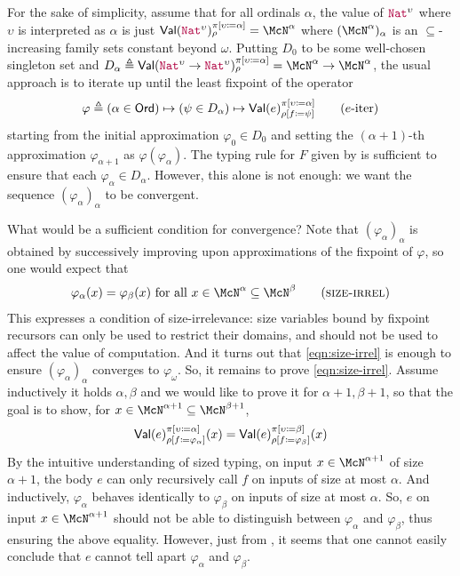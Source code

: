 For the sake of simplicity, assume that for all ordinals $\alpha$, the
value of $\Nat^\upsilon$ where $\upsilon$ is interpreted as $\alpha$
is just
$\Val(\Nat^\upsilon)_\rho^{\subst{\pi}{\upsilon}{\alpha}} =
\McN^\alpha$ where $(\McN^\alpha)_\alpha$ is an $\subseteq$-increasing
family sets constant beyond $\omega$.
%
Putting $D_0$ to be some well-chosen singleton set and
$D_\alpha \triangleq \Val(\Nat^\upsilon \to
\Nat^\upsilon)_\rho^{\subst{\pi}{\upsilon}{\alpha}} = \McN^\alpha \to
\McN^\alpha$, the usual approach is to iterate up until the least
fixpoint of the operator
%
\begin{align*}
  \varphi \triangleq
  (\alpha \in \Ord) \mapsto (\psi \in D_\alpha) \mapsto \Val(e)_{\subst{\rho}{f}{\psi}}^{\subst{\pi}{\upsilon}{\alpha}}
  \tag{$e$-iter}\label{eqn:e-iter}
\end{align*}
%
starting from the initial approximation $\varphi_0 \in D_0$ and
setting the $(\alpha+1)$-th approximation $\varphi_{\alpha+1}$ as
$\varphi(\varphi_\alpha)$.
%
The typing rule for $F$ given by  is sufficient
to ensure that each $\varphi_\alpha \in D_\alpha$.
%
However, this alone is not enough: we want the sequence
$(\varphi_\alpha)_\alpha$ to be convergent.

What would be a sufficient condition for convergence?
%
Note that $(\varphi_\alpha)_\alpha$ is obtained by successively
improving upon approximations of the fixpoint of $\varphi$, so one
would expect that
%
\begin{align*}
  \varphi_\alpha(x) = \varphi_\beta(x) \text{ for all } x \in \McN^\alpha \subseteq \McN^\beta
  \label{eqn:size-irrel}\tag{\textsc{size-irrel}}
\end{align*}
%
This expresses a condition of size-irrelevance: size variables bound
by fixpoint recursors can only be used to restrict their domains, and
should not be used to affect the value of computation.
%
And it turns out that \eqref{eqn:size-irrel} is enough to ensure
$(\varphi_\alpha)_\alpha$ converges to $\varphi_\omega$.
%
So, it remains to prove \eqref{eqn:size-irrel}.
%
Assume inductively it holds $\alpha,\beta$ and we would like to prove
it for $\alpha+1,\beta+1$, so that the goal is to show, for
$x \in \McN^{\alpha+1} \subseteq \McN^{\beta+1}$,
%
\begin{align*}
  \textsf{Val}(e)_{\rho [f \coloneqq \varphi_\alpha]}^{\pi [\upsilon \coloneqq \alpha]}(x) =
  \textsf{Val}(e)_{\rho [f \coloneqq \varphi_\beta]}^{\pi [\upsilon \coloneqq \beta]}(x)
\end{align*}
%
By the intuitive understanding of sized typing, on input
$x \in \McN^{\alpha+1}$ of size $\alpha+1$, the body $e$ can only
recursively call $f$ on inputs of size at most $\alpha$.
%
And inductively, $\varphi_\alpha$ behaves identically to
$\varphi_\beta$ on inputs of size at most $\alpha$.
%
So, $e$ on input $x \in \McN^{\alpha+1}$ should not be able to
distinguish between $\varphi_\alpha$ and $\varphi_\beta$, thus
ensuring the above equality.
%
However, just from , it seems that one cannot
easily conclude that $e$ cannot tell apart $\varphi_\alpha$ and
$\varphi_\beta$.

